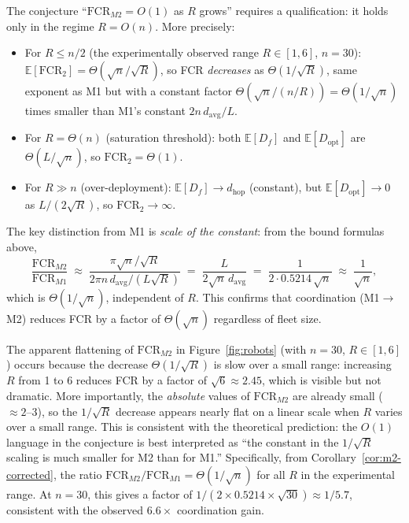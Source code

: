 \begin{corollary}\label{cor:m2-corrected}
The conjecture ``$\mathrm{FCR}_{M2} = O(1)$ as $R$ grows'' requires a
qualification: it holds only in the regime $R = O(n)$.
More precisely:
\begin{itemize}
  \item For $R \leq n/2$ (the experimentally observed range $R \in [1,6]$,
    $n=30$): $\mathbb{E}[\mathrm{FCR}_2] = \Theta(\sqrt{n}/\sqrt{R})$,
    so FCR \emph{decreases} as $\Theta(1/\sqrt{R})$, same exponent as M1
    but with a constant factor $\Theta(\sqrt{n} / (n/R)) = \Theta(1/\sqrt{n})$
    times smaller than M1's constant $2n\,d_{\mathrm{avg}}/L$.
  \item For $R = \Theta(n)$ (saturation threshold): both $\mathbb{E}[D_f]$
    and $\mathbb{E}[D_{\mathrm{opt}}]$ are $\Theta(L/\sqrt{n})$, so
    $\mathrm{FCR}_2 = \Theta(1)$.
  \item For $R \gg n$ (over-deployment): $\mathbb{E}[D_f] \to d_{\mathrm{hop}}$
    (constant), but $\mathbb{E}[D_{\mathrm{opt}}] \to 0$ as $L/(2\sqrt{R})$,
    so $\mathrm{FCR}_2 \to \infty$.
\end{itemize}
The key distinction from M1 is \emph{scale of the constant}:
from the bound formulas above,
\[
  \frac{\mathrm{FCR}_{M2}}{\mathrm{FCR}_{M1}}
  \;\approx\;
  \frac{\pi\sqrt{n}/\sqrt{R}}{2\pi n\,d_{\mathrm{avg}}/(L\sqrt{R})}
  \;=\; \frac{L}{2\sqrt{n}\,d_{\mathrm{avg}}}
  \;=\; \frac{1}{2 \cdot 0.5214\,\sqrt{n}}
  \;\approx\; \frac{1}{\sqrt{n}},
\]
which is $\Theta(1/\sqrt{n})$, independent of $R$.
This confirms that coordination (M1$\to$M2) reduces FCR
by a factor of $\Theta(\sqrt{n})$ regardless of fleet size.
\end{corollary}

\begin{remark}\label{rem:m2-o1}
The apparent flattening of $\mathrm{FCR}_{M2}$ in Figure~\ref{fig:robots}
(with $n=30$, $R \in [1,6]$) occurs because the decrease $\Theta(1/\sqrt{R})$
is slow over a small range: increasing $R$ from 1 to 6 reduces FCR by a
factor of $\sqrt{6} \approx 2.45$, which is visible but not dramatic.
More importantly, the \emph{absolute} values of $\mathrm{FCR}_{M2}$ are
already small ($\approx 2$--$3$), so the $1/\sqrt{R}$ decrease appears
nearly flat on a linear scale when $R$ varies over a small range.
This is consistent with the theoretical prediction: the $O(1)$ language
in the conjecture is best interpreted as ``the constant in the $1/\sqrt{R}$
scaling is much smaller for M2 than for M1.''
Specifically, from Corollary~\ref{cor:m2-corrected}, the ratio
$\mathrm{FCR}_{M2}/\mathrm{FCR}_{M1} = \Theta(1/\sqrt{n})$ for all $R$ in
the experimental range.
At $n=30$, this gives a factor of $1/(2 \times 0.5214 \times \sqrt{30})
\approx 1/5.7$, consistent with the observed $6.6\times$ coordination gain.
\end{remark}

